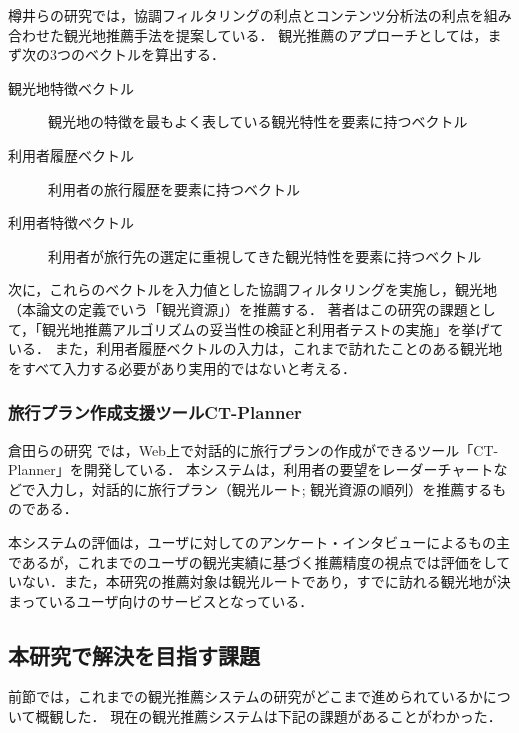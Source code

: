 \documentclass{jsarticle}
\begin{document}
樽井らの研究\cite{tarui}では，協調フィルタリングの利点とコンテンツ分析法の利点を組み合わせた観光地推薦手法を提案している．
観光推薦のアプローチとしては，まず次の3つのベクトルを算出する．

\begin{description}
\item[観光地特徴ベクトル] 観光地の特徴を最もよく表している観光特性を要素に持つベクトル
\item[利用者履歴ベクトル] 利用者の旅行履歴を要素に持つベクトル
\item[利用者特徴ベクトル] 利用者が旅行先の選定に重視してきた観光特性を要素に持つベクトル
\end{description}

次に，これらのベクトルを入力値とした協調フィルタリングを実施し，観光地（本論文の定義でいう「観光資源」）を推薦する．
著者はこの研究の課題として，「観光地推薦アルゴリズムの妥当性の検証と利用者テストの実施」を挙げている．
また，利用者履歴ベクトルの入力は，これまで訪れたことのある観光地をすべて入力する必要があり実用的ではないと考える．

\subsubsection{旅行プラン作成支援ツールCT-Planner}

倉田らの研究\cite{ctplanner}\cite{ctplanner2}\cite{ctplanner3}\cite{ctplanner3b}\cite{ctplanner4}\cite{ctplanner5} では，Web上で対話的に旅行プランの作成ができるツール「CT-Planner\cite{ctplanner_web}」を開発している．
本システムは，利用者の要望をレーダーチャートなどで入力し，対話的に旅行プラン（観光ルート; 観光資源の順列）を推薦するものである．

本システムの評価は，ユーザに対してのアンケート・インタビューによるもの主であるが，これまでのユーザの観光実績に基づく推薦精度の視点では評価をしていない．また，本研究の推薦対象は観光ルートであり，すでに訪れる観光地が決まっているユーザ向けのサービスとなっている．

\subsection{本研究で解決を目指す課題}
\label{problem}

前節では，これまでの観光推薦システムの研究がどこまで進められているかについて概観した．
現在の観光推薦システムは下記の課題があることがわかった．
\end{document}
